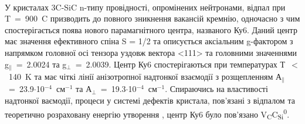\begin{minipage}{\textwidth}\mbox{}\\У кристалах 3C-SiC n-типу провідності, опромінених нейтронами, відпал при T~=~900~\degree C призводить до повного зникнення вакансій кремнію, одночасно з чим спостерігається поява нового парамагнітного центра, названого Ку6. Даний центр має значення ефективного спіна S = 1/2 та описується аксіальним g-фактором з напрямком головної осі тензора уздовж вектора <111> та головними значеннями g$_\parallel$~=~2.0024 та g$_\perp$~=~2.0039. Центр Ку6 спостерігаються при температурах Т~$<$~140~K та має чіткі лінії анізотропної надтонкої взаємодії з розщепленням А$_\parallel$~=~23.9$\cdot$10$^{-4}$~см$^{-1}$ та А$_\perp$~=~19.3$\cdot$10$^{-4}$~см$^{-1}$. Спираючись на властивості надтонкої ваємодії, процеси у системі дефектів кристала, пов'язані з відпалом та теоретично розраховану енергію утворення \citep{met1,met2}, центр Ку6 було пов'язано V\textsubscript{C}C\textsubscript{Si}\textsuperscript{0}.
\end{minipage}

